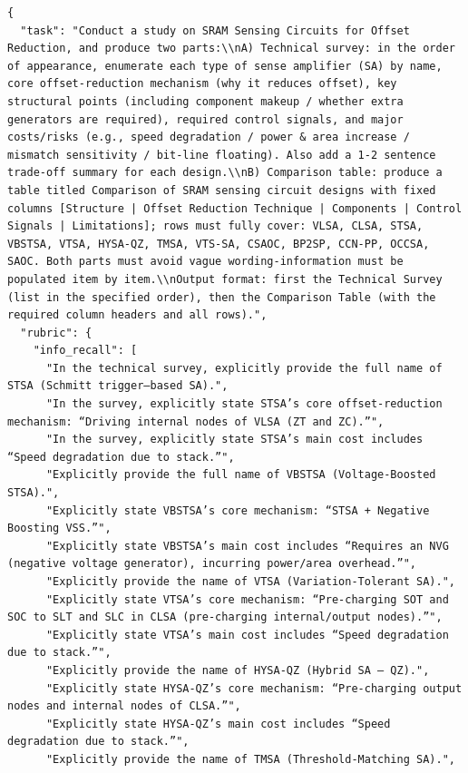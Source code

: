 \documentclass[11pt]{article}
\begin{document}
\begin{tcolorbox}[
  breakable,
  colback=porcelain,
  colframe=gray!75!black,
  left=6pt, right=6pt, top=6pt, bottom=6pt,
  fontupper=\small
]
\begin{lstlisting}[basicstyle=\ttfamily\footnotesize, breaklines=true, frame=none, numbers=none]
{
  "task": "Conduct a study on SRAM Sensing Circuits for Offset Reduction, and produce two parts:\\nA) Technical survey: in the order of appearance, enumerate each type of sense amplifier (SA) by name, core offset-reduction mechanism (why it reduces offset), key structural points (including component makeup / whether extra generators are required), required control signals, and major costs/risks (e.g., speed degradation / power & area increase / mismatch sensitivity / bit-line floating). Also add a 1-2 sentence trade-off summary for each design.\\nB) Comparison table: produce a table titled Comparison of SRAM sensing circuit designs with fixed columns [Structure | Offset Reduction Technique | Components | Control Signals | Limitations]; rows must fully cover: VLSA, CLSA, STSA, VBSTSA, VTSA, HYSA-QZ, TMSA, VTS-SA, CSAOC, BP2SP, CCN-PP, OCCSA, SAOC. Both parts must avoid vague wording-information must be populated item by item.\\nOutput format: first the Technical Survey (list in the specified order), then the Comparison Table (with the required column headers and all rows).",
  "rubric": {
    "info_recall": [
      "In the technical survey, explicitly provide the full name of STSA (Schmitt trigger–based SA).",
      "In the survey, explicitly state STSA’s core offset-reduction mechanism: “Driving internal nodes of VLSA (ZT and ZC).”",
      "In the survey, explicitly state STSA’s main cost includes “Speed degradation due to stack.”",
      "Explicitly provide the full name of VBSTSA (Voltage-Boosted STSA).",
      "Explicitly state VBSTSA’s core mechanism: “STSA + Negative Boosting VSS.”",
      "Explicitly state VBSTSA’s main cost includes “Requires an NVG (negative voltage generator), incurring power/area overhead.”",
      "Explicitly provide the name of VTSA (Variation-Tolerant SA).",
      "Explicitly state VTSA’s core mechanism: “Pre-charging SOT and SOC to SLT and SLC in CLSA (pre-charging internal/output nodes).”",
      "Explicitly state VTSA’s main cost includes “Speed degradation due to stack.”",
      "Explicitly provide the name of HYSA-QZ (Hybrid SA – QZ).",
      "Explicitly state HYSA-QZ’s core mechanism: “Pre-charging output nodes and internal nodes of CLSA.”",
      "Explicitly state HYSA-QZ’s main cost includes “Speed degradation due to stack.”",
      "Explicitly provide the name of TMSA (Threshold-Matching SA).",

\end{lstlisting}
\end{tcolorbox}
\end{document}
